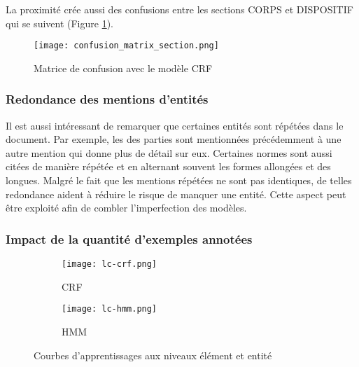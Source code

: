 La proximité crée aussi des confusions entre les sections CORPS et DISPOSITIF qui se suivent (Figure \ref{fig:structuration:matrice-confusion-section}).  

\begin{figure}[h!]
	\centering
	\texttt{[image: confusion\_matrix\_section.png]}
	\caption{Matrice de confusion  avec le modèle CRF}
	\label{fig:structuration:matrice-confusion-section}
\end{figure}

\subsubsection{Redondance des mentions d'entités}
Il est aussi intéressant de remarquer que certaines entités sont répétées dans le document. Par exemple, les des parties sont mentionnées précédemment à une autre mention qui donne plus de détail sur eux. Certaines normes sont aussi citées de manière répétée et en alternant souvent les formes allongées et des longues. Malgré le fait que les mentions répétées ne sont pas identiques, de telles redondance aident à réduire le risque de manquer une entité. Cette aspect peut être exploité afin de combler l'imperfection des modèles.


\subsubsection{Impact de la quantité d'exemples annotées}
\begin{figure}[!h]
	\centering
	\begin{subfigure}[t]{0.95\textwidth}
		\centering
		\texttt{[image: lc-crf.png]}
		\caption{CRF} \label{fig:structuration:learning-curves-crf}
	\end{subfigure} 
	
	\begin{subfigure}[t]{0.95\textwidth}
		\centering
		\texttt{[image: lc-hmm.png]}
		\caption{HMM} \label{fig:structuration:learning-curves-hmm}
	\end{subfigure}
	\caption{Courbes d'apprentissages aux niveaux élément et entité} \label{fig:structuration:learning-curves}
\end{figure}


